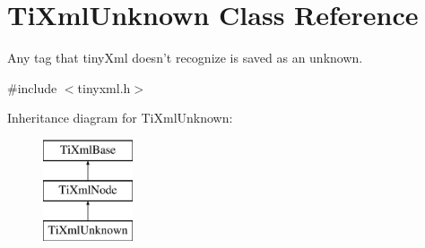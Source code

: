 \hypertarget{class_ti_xml_unknown}{
\section{TiXmlUnknown Class Reference}
\label{class_ti_xml_unknown}
}


Any tag that tinyXml doesn't recognize is saved as an unknown.  




{\ttfamily \#include $<$tinyxml.h$>$}

Inheritance diagram for TiXmlUnknown:\begin{figure}[H]
\begin{center}
\leavevmode
\includegraphics[height=3.000000cm]{class_ti_xml_unknown}
\end{center}
\end{figure}
